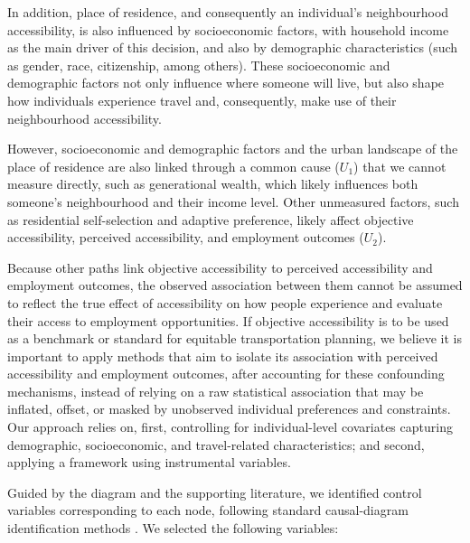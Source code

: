 \documentclass[preprint, 3p,
authoryear]{elsarticle} %
\begin{document}
In addition, place of residence, and consequently an individual's
neighbourhood accessibility, is also influenced by socioeconomic
factors, with household income as the main driver of this decision, and
also by demographic characteristics (such as gender, race, citizenship,
among others). These socioeconomic and demographic factors not only
influence where someone will live, but also shape how individuals
experience travel and, consequently, make use of their neighbourhood
accessibility.

However, socioeconomic and demographic factors and the urban landscape
of the place of residence are also linked through a common cause
(\(U_1\)) that we cannot measure directly, such as generational wealth,
which likely influences both someone's neighbourhood and their income
level. Other unmeasured factors, such as residential self-selection and
adaptive preference, likely affect objective accessibility, perceived
accessibility, and employment outcomes (\(U_2\)).

Because other paths link objective accessibility to perceived
accessibility and employment outcomes, the observed association between
them cannot be assumed to reflect the true effect of accessibility on
how people experience and evaluate their access to employment
opportunities. If objective accessibility is to be used as a benchmark
or standard for equitable transportation planning, we believe it is
important to apply methods that aim to isolate its association with
perceived accessibility and employment outcomes, after accounting for
these confounding mechanisms, instead of relying on a raw statistical
association that may be inflated, offset, or masked by unobserved
individual preferences and constraints. Our approach relies on, first,
controlling for individual-level covariates capturing demographic,
socioeconomic, and travel-related characteristics; and second, applying
a framework using instrumental variables.

Guided by the diagram and the supporting literature, we identified
control variables corresponding to each node, following standard
causal-diagram identification methods
\citep{cunningham2021causal, huntington-klein2021}. We selected the
following variables:
\end{document}
